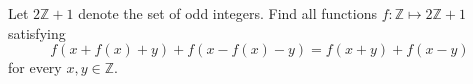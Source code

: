 Let 
$2\mathbb{Z} + 1$
 denote the set of odd integers. Find all functions 
$f:\mathbb{Z} \mapsto 2\mathbb{Z} + 1$
 satisfying 
\[ f(x + f(x) + y) + f(x - f(x) - y) = f(x+y) + f(x-y) \]
for every 
$x, y \in \mathbb{Z}$.